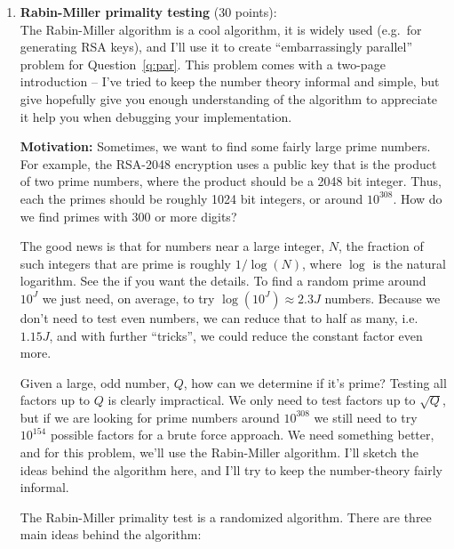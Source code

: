 \documentclass{article}
\begin{document}
\begin{enumerate}
  \item \textbf{Rabin-Miller primality testing} (30 points):\label{q:rabin-miller}\\
    The Rabin-Miller algorithm is a cool algorithm, it is widely used (e.g.\ for generating RSA keys),
    and I'll use it to create ``embarrassingly parallel'' problem for Question~\ref{q:par}.
    This problem comes with a two-page introduction -- I've tried to keep the number theory informal
    and simple, but give hopefully give you enough understanding of the algorithm to appreciate it
    help you when debugging your implementation.

    \textbf{Motivation:} Sometimes, we want to find some fairly large prime numbers.
    For example, the RSA-2048 encryption uses a public key that is the product of
    two prime numbers, where the product should be a 2048 bit integer.
    Thus, each the primes should be roughly 1024 bit integers, or around $10^{308}$.
    How do we find primes with 300 or more digits?
    \par
    The good news is that for numbers near a large integer, $N$, the fraction of
    such integers that are prime is roughly $1/\log(N)$, where $\log$ is the
    natural logarithm.
    See the 
    if you want the details.
    To find a random prime around $10^{J}$ we just need, on average, to try $\log(10^J) \approx 2.3J$ numbers.
    Because we don't need to test even numbers, we can reduce that to half as many, i.e.\ $1.15J$,
    and with further ``tricks'', we could reduce the constant factor even more.
    \par
    Given a large, odd number, $Q$, how can we determine if it's prime?
    Testing all factors up to $Q$ is clearly impractical.
    We only need to test factors up to $\sqrt{Q}$, but if we are looking for prime numbers
    around $10^{308}$ we still need to try $10^{154}$ possible factors for a brute force approach.
    We need something better, and for this problem, we'll use the Rabin-Miller algorithm.
    I'll sketch the ideas behind the algorithm here, and I'll try to keep the number-theory
    fairly informal.
    \par
    The Rabin-Miller primality test is a randomized algorithm.
    There are three main ideas behind the algorithm:
\end{enumerate}
\end{document}
